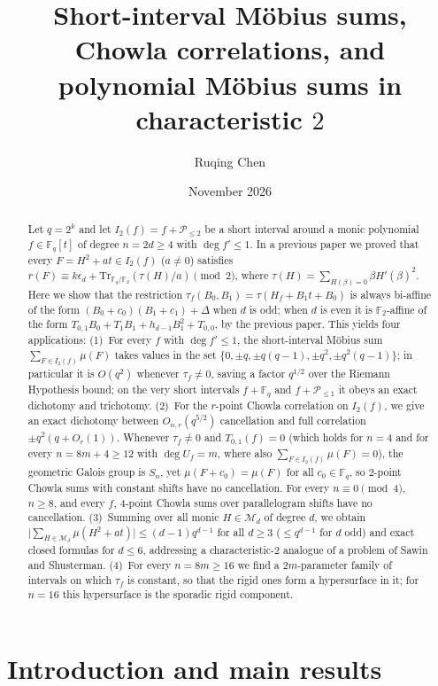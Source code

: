 \documentclass[11pt,a4paper]{amsart}
\title[M\"obius cancellation and Chowla correlations in characteristic $2$]{Short-interval M\"obius sums, Chowla
correlations, and polynomial M\"obius sums in characteristic \texorpdfstring{$2$}{2}}
\author{Ruqing Chen}
\date{November 2026}
\theoremstyle{remark}
\numberwithin{equation}{section}
\newcommand{\Fq}{\mathbb{F}_q}
\newcommand{\Ftwo}{\mathbb{F}_2}
\newcommand{\Tr}{\mathrm{Tr}}
\newcommand{\Pe}{\mathcal{P}}
\newcommand{\Me}{\mathcal{M}}
\begin{document}
\begin{abstract}
Let $q=2^k$ and let $I_2(f)=f+\Pe_{\le 2}$ be a short interval around a monic polynomial $f\in\Fq[t]$ of degree
$n=2d\ge 4$ with $\deg f'\le 1$. In a previous paper we proved that every $F=H^2+at\in I_2(f)$ ($a\ne 0$) satisfies
$r(F)\equiv k\epsilon_d+\Tr_{\Fq/\Ftwo}(\tau(H)/a)\pmod 2$, where $\tau(H)=\sum_{H(\beta)=0}\beta H'(\beta)^2$. Here we
show that the restriction $\tau_f(B_0,B_1)=\tau(H_f+B_1t+B_0)$ is always bi-affine of the form
$(B_0+c_0)(B_1+c_1)+\Delta$ when $d$ is odd; when $d$ is even it is $\Ftwo$-affine of the form
$T_{0,1}B_0+T_1B_1+h_{d-1}B_1^2+T_{0,0}$, by the previous paper. This yields four applications:
(1)~For every $f$ with $\deg f'\le 1$, the short-interval M\"obius sum $\sum_{F\in I_2(f)}\mu(F)$ takes values in the
set $\{0,\pm q,\pm q(q-1),\pm q^2,\pm q^2(q-1)\}$; in particular it is $O(q^2)$ whenever $\tau_f\ne 0$,
saving a factor $q^{1/2}$ over the Riemann Hypothesis bound; on the very short intervals $f+\Fq$ and $f+\Pe_{\le 1}$
it obeys an exact dichotomy and trichotomy.
(2)~For the $r$-point Chowla correlation on $I_2(f)$, we give an exact dichotomy between $O_{n,r}(q^{5/2})$ cancellation
and full correlation $\pm q^2(q+O_r(1))$. Whenever $\tau_f\ne 0$ and $T_{0,1}(f)=0$ (which holds for $n=4$ and for
every $n=8m+4\ge 12$ with $\deg U_f=m$, where also $\sum_{F\in I_2(f)}\mu(F)=0$), the geometric Galois group is $S_n$,
yet $\mu(F+c_0)=\mu(F)$ for all $c_0\in\Fq$, so $2$-point Chowla sums with constant shifts have no cancellation.
For every $n\equiv 0\pmod 4$, $n\ge 8$, and every $f$, $4$-point Chowla sums over parallelogram shifts have no
cancellation.
(3)~Summing over all monic $H\in\Me_d$ of degree $d$, we obtain $\bigl|\sum_{H\in\Me_d}\mu(H^2+at)\bigr|\le (d-1)q^{d-1}$
for all $d\ge 3$ ($\le q^{d-1}$ for $d$ odd) and exact closed formulas for $d\le 6$, addressing a characteristic-$2$
analogue of a problem of Sawin and Shusterman.
(4)~For every $n=8m\ge 16$ we find a $2m$-parameter family of intervals on which $\tau_f$ is constant, so that the
rigid ones form a hypersurface in it; for $n=16$ this hypersurface is the sporadic rigid component.
\end{abstract}

\maketitle

\section{Introduction and main results}\label{sec:intro}
\end{document}
